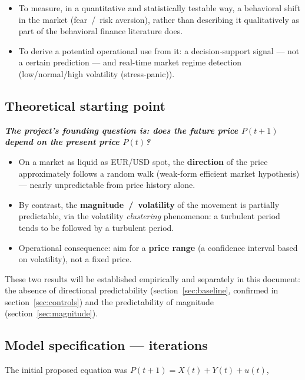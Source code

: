\documentclass[12pt,a4paper]{article}
\begin{document}
\begin{itemize}
	\item[\textbf{(a)}] To measure, in a quantitative and statistically
	testable way, a behavioral shift in the market
	(fear~/~risk aversion), rather than describing it
	qualitatively as part of the behavioral finance
	literature does.
	\item[\textbf{(b)}] To derive a potential operational use from it: a
	decision-support signal --- not a certain prediction --- and
	real-time market regime detection (low/normal/high volatility (stress-panic)).
\end{itemize}





\subsection{Theoretical starting point}

\textbf{\textit{	The project's founding question is: does the future price $P(t+1)$ depend on the present price $P(t)$?}}

\begin{itemize}
	\item On a market as liquid as EUR/USD spot, the
	\textbf{direction} of the price approximately follows a random
	walk (weak-form efficient market hypothesis) --- nearly
	unpredictable from price history alone.
	\item By contrast, the \textbf{magnitude~/~volatility} of the
	movement is partially predictable, via the volatility
	\emph{clustering} phenomenon: a turbulent period tends to be
	followed by a turbulent period.
	\item Operational consequence: aim for a \textbf{price range} (a confidence interval based on volatility), not a fixed price.
\end{itemize}

These two results will be established empirically and separately in this document: the absence of directional predictability
(section~\ref{sec:baseline}, confirmed in section~\ref{sec:controls}) and the predictability of magnitude (section~\ref{sec:magnitude}).

\subsection{Model specification --- iterations}
\label{sec:spec-iterations}


The initial proposed equation was
$P(t+1) = X(t) + Y(t) + u(t)$, 
\end{document}
